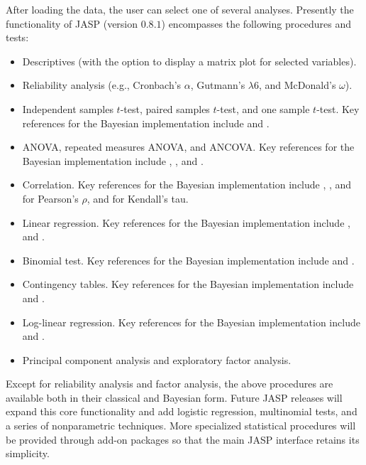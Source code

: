 After loading the data, the user can select one of several analyses. Presently the functionality of JASP (version $0.8.1$) encompasses the following procedures and tests:
\begin{itemize}
\item Descriptives (with the option to display a matrix plot for selected variables).
\item Reliability analysis (e.g., Cronbach's $\alpha$, Gutmann's $\lambda 6$, and McDonald's $\omega$).
\item Independent samples $t$-test, paired samples $t$-test, and one sample $t$-test. Key references for the Bayesian implementation include  and .
\item ANOVA, repeated measures ANOVA, and ANCOVA. Key references for the Bayesian implementation include , , and .
\item Correlation. Key references for the Bayesian implementation include , , and  for Pearson's $\rho$, and  for Kendall's tau.
\item Linear regression. Key references for the Bayesian implementation include , and .
\item Binomial test. Key references for the Bayesian implementation include  and .
\item Contingency tables. Key references for the Bayesian implementation include  and .
\item Log-linear regression. Key references for the Bayesian implementation include  and .
\item Principal component analysis and exploratory factor analysis.
\end{itemize}
Except for reliability analysis and factor analysis, the above procedures are available both in their classical and Bayesian form. Future JASP releases will expand this core functionality and add logistic regression, multinomial tests, and a series of nonparametric techniques. More specialized statistical procedures will be provided through add-on packages so that the main JASP interface retains its simplicity.

